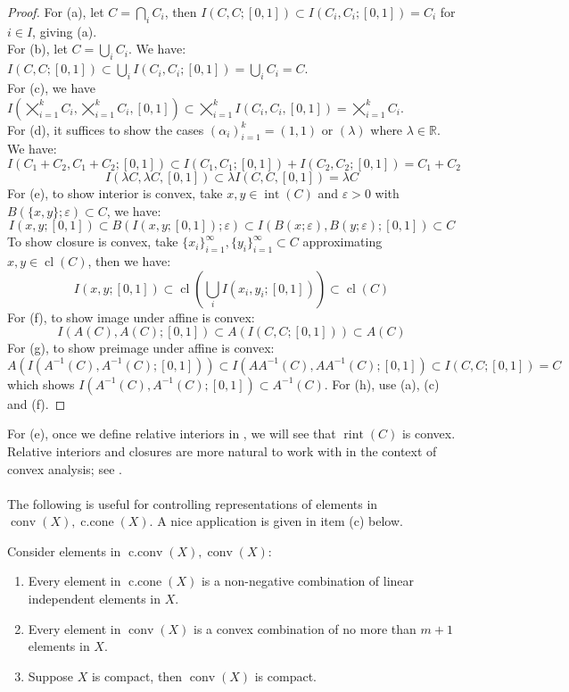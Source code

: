 \begin{proof}For (a), let $C=\bigcap_iC_i$, then $I(C,C;[0,1])\subset I(C_i,C_i;[0,1])=C_i$ for $i\in I$, giving (a).\\
	For (b), let $C=\bigcup_iC_i$. We have: $I(C,C;[0,1])\subset \bigcup_iI(C_i,C_i;[0,1])=\bigcup_iC_i=C$.\\
	For (c), we have $I(\bigtimes_{i=1}^kC_i,\bigtimes_{i=1}^kC_i,[0,1])\subset \bigtimes_{i=1}^kI(C_i,C_i,[0,1])=\bigtimes_{i=1}^kC_i$.\\
	For (d), it suffices to show the cases $(\alpha_i)_{i=1}^k=(1,1)$ or $(\lambda)$ where $\lambda\in \mathbb{R}$. We have:
	\[
		I(C_1+C_2,C_1+C_2;[0,1])\subset I(C_1,C_1;[0,1])+I(C_2,C_2;[0,1])=C_1+C_2
	\]
	\[
		I(\lambda C,\lambda C,[0,1])\subset\lambda I(C,C,[0,1])=\lambda C
	\]
	For (e), to show interior is convex, take $x,y\in \operatorname{int}(C)$ and $\varepsilon>0$ with $B(\{x, y\};\varepsilon)\subset C$, we have:
	\[
		I(x, y;[0, 1])\subset B(I(x, y;[0, 1]);\varepsilon)\subset I(B(x;\varepsilon),B(y;\varepsilon); [0, 1])\subset C
	\]
	To show closure is convex, take $\{x_i\}_{i=1}^\infty,\{y_i\}_{i=1}^\infty\subset C$ approximating $x,y\in \operatorname{cl}(C)$, then we have:
	\[
		I(x,y;[0,1])\subset \operatorname{cl}\left(\bigcup_{i}I(x_i,y_i;[0,1])\right)\subset \operatorname{cl}(C)
	\]
	For (f), to show image under affine is convex:
	\[
		I(A(C),A(C);[0,1])\subset A(I(C,C;[0,1]))\subset A(C)
	\]
	For (g), to show preimage under affine is convex:
	\[
		A\left(I\left(A^{-1}(C),A^{-1}(C);[0,1]\right)\right)\subset I\left(AA^{-1}(C),AA^{-1}(C);[0,1]\right)\subset I(C,C;[0,1])=C
	\]
	which shows $I(A^{-1}(C),A^{-1}(C);[0,1])\subset A^{-1}(C)$. For (h), use (a), (c) and (f).
\end{proof}

\begin{rmrk}
	For (e), once we define relative interiors in , we will see that $\operatorname{rint}(C)$ is convex. Relative interiors and closures are more natural to work with in the context of convex analysis; see .
\end{rmrk}

\paragraph{}The following is useful for controlling representations of elements in $\operatorname{conv}(X),\operatorname{c.cone}(X)$. A nice application is given in item (c) below.

\begin{prop}[Caratheodory]\label{prop:011-cara}
	Consider elements in $\operatorname{c.conv}(X),\operatorname{conv}(X)$:
	\begin{enumerate}[label=(\alph*)]
		\item Every element in $\operatorname{c.cone}(X)$ is a non-negative combination of linear independent elements in $X$.
		\item Every element in $\operatorname{conv}(X)$ is a convex combination of no more than $m+1$ elements in $X$.
		\item Suppose $X$ is compact, then $\operatorname{conv}(X)$ is compact.
	\end{enumerate}
\end{prop}

